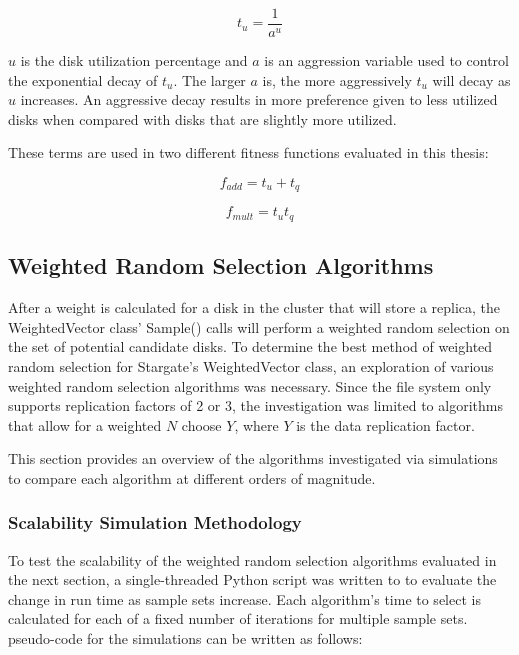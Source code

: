 \documentclass[12pt]{article}
\begin{document}
  \begin{equation}
    t_{u} = \frac{1}{a^{u}}
  \end{equation}

  $u$ is the disk utilization percentage and $a$ is an aggression variable used
  to control the exponential decay of $t_{u}$. The larger $a$ is, the
  more aggressively $t_{u}$ will decay as $u$ increases. An
  aggressive decay results in more preference given to less utilized disks when
  compared with disks that are slightly more utilized.

  These terms are used in two different fitness functions evaluated in this
  thesis:

  \begin{equation}
    f_{add} = t_{u} + t_{q}
  \end{equation}

  \begin{equation}
    f_{mult} = t_{u}t_{q}
  \end{equation}


  \subsection{Weighted Random Selection Algorithms}

  After a weight is calculated for a disk in the cluster that will store a
  replica, the WeightedVector class' Sample() calls will perform a weighted
  random selection on the set of potential candidate disks. To determine the
  best method of weighted random selection for Stargate's WeightedVector class,
  an exploration of various weighted random selection algorithms was necessary.
  Since the file system only supports replication factors of 2 or 3, the
  investigation was limited to algorithms that allow for a weighted $N$ choose
  $Y$, where $Y$ is the data replication factor.

  This section provides an overview of the algorithms investigated via
  simulations to compare each algorithm at different orders of magnitude.

    \subsubsection{Scalability Simulation Methodology}
     To test the scalability of the weighted random selection algorithms
     evaluated in the next section, a single-threaded Python script was written
     to to evaluate the change in run time as sample sets increase. Each
     algorithm's time to select is calculated for each of a fixed number of
     iterations for multiple sample sets. pseudo-code for the simulations
     can be written as follows:
\end{document}
